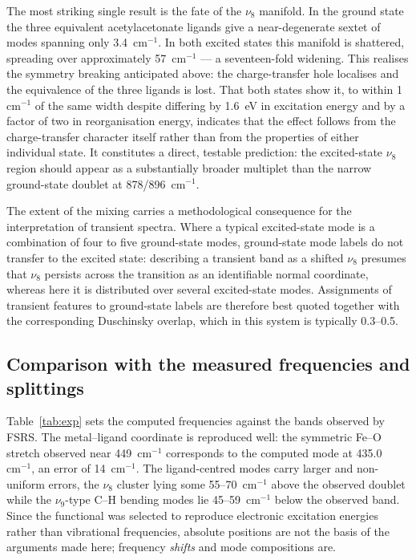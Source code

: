 \documentclass[11pt,a4paper]{article}
\newcommand{\wn}{\ensuremath{\mathrm{cm^{-1}}}}
\begin{document}
The most striking single result is the fate of the $\nu_8$ manifold. In the
ground state the three equivalent acetylacetonate ligands give a near-degenerate
sextet of modes spanning only 3.4~\wn{}. In both excited states this manifold
is shattered, spreading over approximately 57~\wn{} --- a seventeen-fold
widening. This realises the symmetry breaking anticipated above:
the charge-transfer hole localises and the equivalence of the three ligands is
lost. That both states show it, to within 1~\wn{} of the same width despite
differing by 1.6~eV in excitation energy and by a factor of two in
reorganisation energy, indicates that the effect follows from the
charge-transfer character itself rather than from the properties of either
individual state. It constitutes a direct, testable prediction: the excited-state $\nu_8$ region
should appear as a substantially broader multiplet than the narrow ground-state
doublet at 878/896~\wn{}.

The extent of the mixing carries a methodological consequence for the
interpretation of transient spectra. Where a typical excited-state mode is a
combination of four to five ground-state modes, ground-state mode labels do not
transfer to the excited state: describing a transient band as a shifted
$\nu_8$ presumes that $\nu_8$ persists across the transition as an
identifiable normal coordinate, whereas here it is distributed over several
excited-state modes. Assignments of transient features to ground-state labels
are therefore best quoted together with the corresponding Duschinsky overlap,
which in this system is typically 0.3--0.5.

\subsection{Comparison with the measured frequencies and splittings}
\label{sec:exp}

Table~\ref{tab:exp} sets the computed frequencies against the bands observed by
FSRS. The metal--ligand coordinate is reproduced well: the symmetric Fe--O
stretch observed near 449~\wn{} corresponds to the computed mode at
435.0~\wn{}, an error of 14~\wn{}. The ligand-centred modes carry larger and
non-uniform errors, the $\nu_8$ cluster lying some 55--70~\wn{} above the
observed doublet while the $\nu_9$-type C--H bending modes lie 45--59~\wn{}
below the observed band. Since the functional was selected to reproduce
electronic excitation energies rather than vibrational frequencies, absolute
positions are not the basis of the arguments made here; frequency
\emph{shifts} and mode compositions are.
\end{document}
